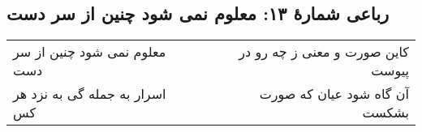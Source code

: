 \begin{center}
\section*{رباعی شمارهٔ ۱۳: معلوم نمی شود چنین از سر دست}
\label{sec:013}
\begin{longtable}{l p{0.5cm} r}
معلوم نمی شود چنین از سر دست
&&
کاین صورت و معنی ز چه رو در پیوست
\\
اسرار به جمله گی به نزد هر کس
&&
آن گاه شود عیان که صورت بشکست
\\
\end{longtable}
\end{center}
